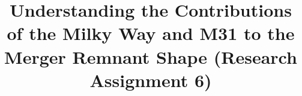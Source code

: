 \documentclass[linenumbers,trackchanges]{aastex7}
\begin{document}
\title{Understanding the Contributions of the Milky Way and M31 to the Merger Remnant Shape (Research Assignment 6)}

\end{document}
